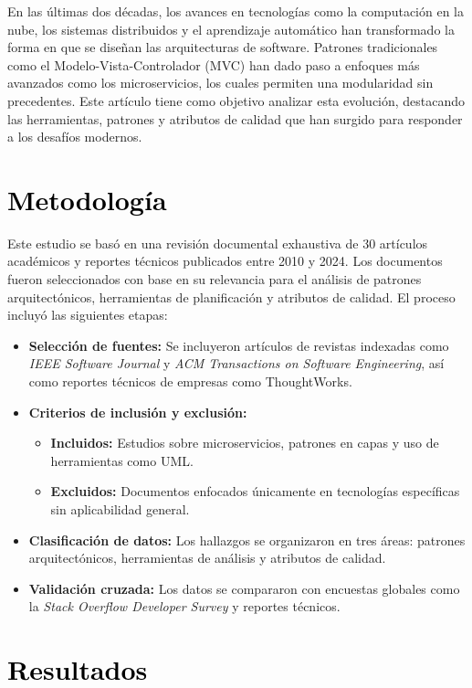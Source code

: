 \documentclass[12pt,a4paper]{article}
\begin{document}
\begin{multicols}{2}
En las últimas dos décadas, los avances en tecnologías como la computación en la nube, los sistemas distribuidos y el aprendizaje automático han transformado la forma en que se diseñan las arquitecturas de software. Patrones tradicionales como el Modelo-Vista-Controlador (MVC) han dado paso a enfoques más avanzados como los microservicios, los cuales permiten una modularidad sin precedentes. Este artículo tiene como objetivo analizar esta evolución, destacando las herramientas, patrones y atributos de calidad que han surgido para responder a los desafíos modernos.

\section{\textcolor{black}{Metodología}}
Este estudio se basó en una revisión documental exhaustiva de 30 artículos académicos y reportes técnicos publicados entre 2010 y 2024. Los documentos fueron seleccionados con base en su relevancia para el análisis de patrones arquitectónicos, herramientas de planificación y atributos de calidad. El proceso incluyó las siguientes etapas:

\begin{itemize}
    \item \textbf{Selección de fuentes:} Se incluyeron artículos de revistas indexadas como \textit{IEEE Software Journal} y \textit{ACM Transactions on Software Engineering}, así como reportes técnicos de empresas como ThoughtWorks.
    \item \textbf{Criterios de inclusión y exclusión:}
        \begin{itemize}
            \item \textbf{Incluidos:} Estudios sobre microservicios, patrones en capas y uso de herramientas como UML.
            \item \textbf{Excluidos:} Documentos enfocados únicamente en tecnologías específicas sin aplicabilidad general.
        \end{itemize}
    \item \textbf{Clasificación de datos:} Los hallazgos se organizaron en tres áreas: patrones arquitectónicos, herramientas de análisis y atributos de calidad.
    \item \textbf{Validación cruzada:} Los datos se compararon con encuestas globales como la \textit{Stack Overflow Developer Survey} y reportes técnicos.
\end{itemize}

\section{\textcolor{black}{Resultados}}

\end{multicols}
\end{document}
